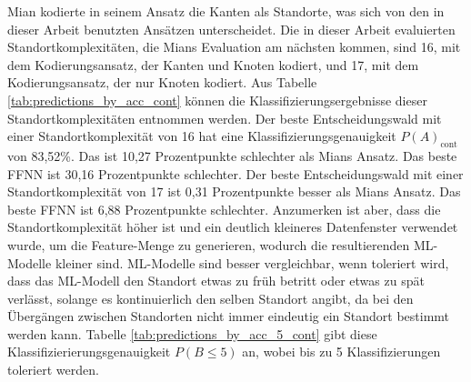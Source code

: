 \newline
\newline
Mian kodierte in seinem Ansatz die Kanten als Standorte, was sich von den in dieser Arbeit benutzten Ansätzen unterscheidet.
Die in dieser Arbeit evaluierten Standortkomplexitäten, die Mians Evaluation am nächsten kommen, sind 16, mit dem Kodierungsansatz, der Kanten und Knoten kodiert,
und 17, mit dem Kodierungsansatz, der nur Knoten kodiert.
\newline
\newline
Aus Tabelle \ref{tab:predictions_by_acc_cont} können die Klassifizierungsergebnisse dieser Standortkomplexitäten entnommen werden.
Der beste Entscheidungswald mit einer Standortkomplexität von 16 hat eine Klassifizierungsgenauigkeit $P(A)_{\text{cont}}$ von 83,52\%.
Das ist 10,27 Prozentpunkte schlechter als Mians Ansatz.
Das beste FFNN ist 30,16 Prozentpunkte schlechter.
\newpage
Der beste Entscheidungswald mit einer Standortkomplexität von 17 ist 0,31 Prozentpunkte besser als Mians Ansatz.
Das beste FFNN ist 6,88 Prozentpunkte schlechter.
Anzumerken ist aber, dass die Standortkomplexität höher ist und ein deutlich kleineres Datenfenster verwendet wurde,
um die Feature-Menge zu generieren, wodurch die resultierenden ML-Modelle kleiner sind.
\newline
\newline
ML-Modelle sind besser vergleichbar, wenn toleriert wird, dass das ML-Modell den Standort etwas zu früh betritt oder etwas zu spät verlässt,
solange es kontinuierlich den selben Standort angibt, da bei den Übergängen zwischen Standorten nicht immer eindeutig ein Standort bestimmt werden kann.
Tabelle \ref{tab:predictions_by_acc_5_cont} gibt diese Klassifizierierungsgenauigkeit $P(B\leq5)$ an, wobei bis zu 5 Klassifizierungen toleriert werden.
